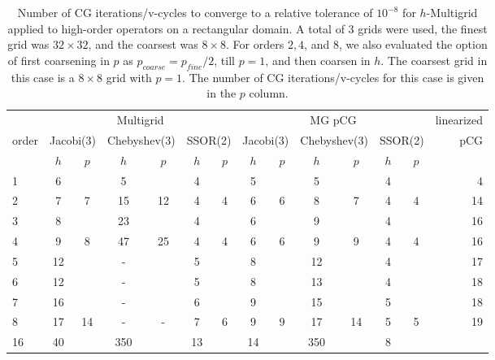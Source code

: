 \begin{table}
  \caption{\label{tab:box}  Number of CG iterations/v-cycles to converge to a relative tolerance of $10^{-8}$ for $h$-Multigrid applied to high-order operators on a rectangular domain. A total of 3 grids were used, the finest grid was $32\times 32$, and the coarsest was $8\times 8$. For orders $2,4$, and $8$, we also evaluated the option of first coarsening in $p$ as $p_{coarse} = p_{fine}/2$, till $p=1$, and then coarsen in $h$. The coarsest grid in this case is a $8\times 8$ grid with $p=1$. The number of CG iterations/v-cycles for this case is given in the $p$ column.}
		\centering
    \begin{tabular}{|l|c|c|c|c|c|c|c|c|c|c|c|c|r|} 
\hline
                     & \multicolumn{6}{c|}{Multigrid} & \multicolumn{6}{c|}{MG pCG} &          linearized \\
										 \cline{2-13}
			order &  \multicolumn{2}{c|}{\scriptsize  Jacobi(3)} &  \multicolumn{2}{c|}{\scriptsize Chebyshev(3)} & \multicolumn{2}{c|}{\scriptsize  SSOR(2)} & \multicolumn{2}{c|}{\scriptsize Jacobi(3)} &  \multicolumn{2}{c|}{\scriptsize Chebyshev(3)} & \multicolumn{2}{c|}{\scriptsize SSOR(2)} & pCG\\
\hline
 & $h$ & $p$ & $h$ & $p$& $h$ & $p$& $h$ & $p$& $h$ & $p$& $h$ & $p$& \\
 \cline{2-13}
    1 & 6 & & 5 & & 4 & & 5 & & 5 & & 4 & & 4 \\
		2 & 7 & 7 & 15 & 12 & 4 & 4 & 6 & 6 & 8 & 7 & 4 & 4 & 14\\
		3 & 8 & & 23 & & 4 & & 6 & & 9 & & 4 & & 16 \\
		4 & 9 & 8 & 47 & 25 & 4 & 4 & 6 & 6 & 9 & 9 & 4 & 4 & 16 \\
		5 & 12 & & - & & 5 & & 8 & & 12 & & 4 & & 17 \\
		6 & 12 & & - & & 5 & & 8 & & 13 & & 4 & & 18 \\
		7 & 16 & & - & & 6 & & 9 & & 15 & & 5 & & 18 \\
		8 & 17 & 14 & - & - & 7 & 6 & 9 & 9 & 17 & 14 & 5 & 5 & 19\\             
    16 & 40 & & 350 & & 13 & & 14 & & 350 & & 8 & & \\ 
\hline
	  \end{tabular}
\end{table}

